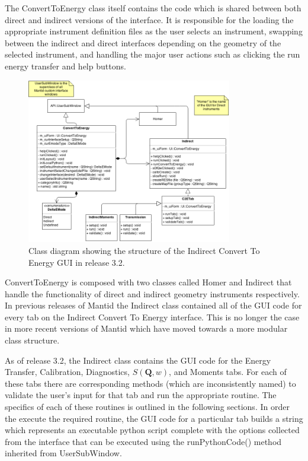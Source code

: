 \documentclass[paper=a4, fontsize=11pt]{scrartcl}	%
\numberwithin{equation}{section}															%
\numberwithin{figure}{section}																%
\numberwithin{table}{section}																%
\begin{document}
The ConvertToEnergy class itself contains the code which is shared between both direct and indirect versions of the interface. It is responsible for the loading the appropriate instrument definition files as the user selects an instrument, swapping between the indirect and direct interfaces depending on the geometry of the selected instrument, and handling the major user actions such as clicking the run energy transfer and help buttons.

\begin{figure}[H]
\centering
\includegraphics[width=0.8\textwidth]{img/uml/class_diagrams/C2E_structure.png}
\caption{Class diagram showing the structure of the Indirect Convert To Energy GUI in release 3.2.}
\label{fig:c2e-class-diagram}
\end{figure}

ConvertToEnergy is composed with two classes called Homer and Indirect that handle the functionality of direct and indirect geometry instruments respectively. In previous releases of Mantid the Indirect class contained all of the GUI code for every tab on the Indirect Convert To Energy interface. This is no longer the case in more recent versions of Mantid which have moved towards a more modular class structure.

As of release 3.2, the Indirect class contains the GUI code for the Energy Transfer, Calibration, Diagnostics, $S(\textbf{Q},w)$, and Moments tabs. For each of these tabs there are corresponding methods (which are inconsistently named) to validate the user's input for that tab and run the appropriate routine. The specifics of each of these routines is outlined in the following sections. In order the execute the required routine, the GUI code for a particular tab builds a string which represents an executable python script complete with the options collected from the interface that can be executed using the runPythonCode() method inherited from UserSubWindow.
\end{document}
